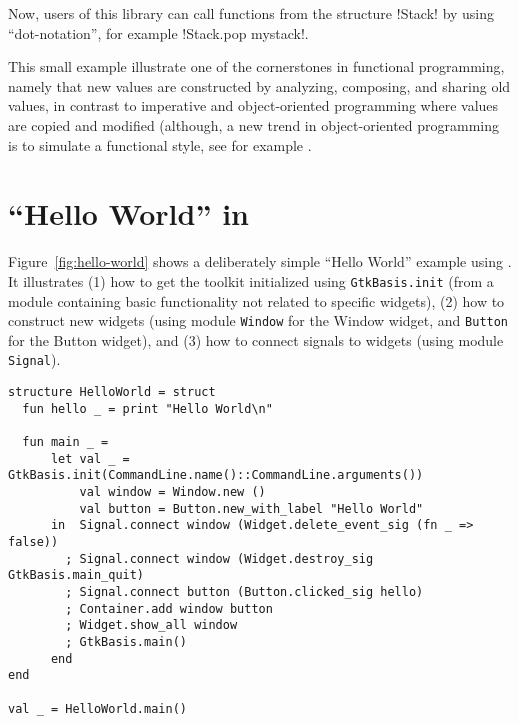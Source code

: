 \documentclass[workingdraft]{usetex-v1}
\begin{document}
Now, users of this library can call functions from the structure
!Stack! by using ``dot-notation'', for example !Stack.pop mystack!.

This small example illustrate one of the cornerstones in functional
programming, namely that new values are constructed by analyzing,
composing, and sharing old values, in contrast to imperative and
object-oriented programming where values are copied and modified
(although, a new trend in object-oriented programming is to simulate a
functional style, see for example \cite[Item 13 and
14]{bloch01:effective-java}.










\section{``Hello World'' in \mgtk}
\label{sec:example}

Figure~\ref{fig:hello-world} shows a deliberately simple ``Hello World''
example using \mgtk. It illustrates (1) how to get the toolkit
initialized using \texttt{GtkBasis.init} (from a module containing
basic \gtk functionality not related to specific widgets), (2) how to
construct new widgets (using module \texttt{Window} for the Window
widget, and \texttt{Button} for the Button widget), and (3) how to
connect signals to widgets (using module \texttt{Signal}).
\begin{figure*}[htp]
\begin{centering}
\begin{verbatim}
structure HelloWorld = struct
  fun hello _ = print "Hello World\n"

  fun main _ =
      let val _ = GtkBasis.init(CommandLine.name()::CommandLine.arguments())
          val window = Window.new ()
          val button = Button.new_with_label "Hello World"
      in  Signal.connect window (Widget.delete_event_sig (fn _ => false))
        ; Signal.connect window (Widget.destroy_sig GtkBasis.main_quit)
        ; Signal.connect button (Button.clicked_sig hello)
        ; Container.add window button
        ; Widget.show_all window
        ; GtkBasis.main() 
      end
end

val _ = HelloWorld.main()
\end{verbatim}
\caption{Hello World in \mgtk.\label{fig:hello-world}}
\end{centering}
\end{figure*}
\end{document}
